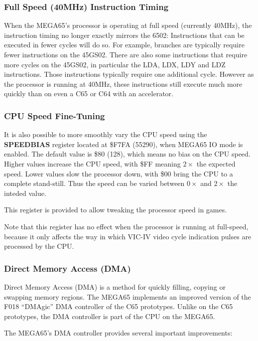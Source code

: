 \subsubsection{Full Speed (40MHz) Instruction Timing}

When the MEGA65's processor is operating at full speed (currently 40MHz), the instruction
timing no longer exactly mirrors the 6502: Instructions that can be executed in fewer cycles
will do so. For example, branches are typically require fewer instructions on the 45GS02.
There are also some instructions that require more cycles on the 45GS02, in particular the
LDA, LDX, LDY and LDZ instructions. Those instructions typically require one additional cycle.
However as the processor is running at 40MHz, these instructions still execute much more quickly
than on even a C65 or C64 with an accelerator.

\subsubsection{CPU Speed Fine-Tuning}
It is also possible to more smoothly
vary the CPU speed using the {\bf SPEEDBIAS} register located at \$F7FA (55290), when MEGA65 IO mode
is enabled.  The default value is \$80 (128), which means no bias on the CPU speed.  Higher values
increase the CPU speed, with \$FF meaning $2\times$ the expected speed. Lower values slow
the processor down, with \$00 bring the CPU to a complete stand-still.  Thus the speed can be
varied between $0\times$ and $2\times$ the inteded value.
 
This register is provided to allow tweaking the processor speed in games.

Note that this register has no effect when
the processor is running at full-speed, because it only affects the way in which VIC-IV
video cycle indication pulses are processed by the CPU.  

\subsubsection{Direct Memory Access (DMA)}
Direct Memory Access (DMA) is a method for quickly filling, copying or swapping memory regions.
The MEGA65 implements an improved version of the F018 ``DMAgic'' DMA controller of the C65 prototypes.
Unlike on the C65 prototypes, the DMA controller is part of the CPU on the MEGA65.

The MEGA65's DMA controller provides several important improvements:

